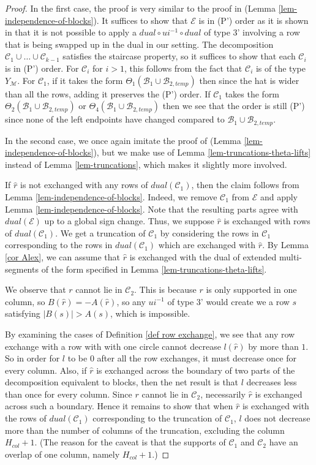 \documentclass[11pt,letterpaper]{amsart}
\newcommand{\inv}{^{-1}}
\newcommand{\BB}{\mathcal{B}}
\newcommand{\CC}{\mathcal{C}}
\newcommand{\EE}{\mathcal{E}}
\numberwithin{equation}{section}
\begin{document}
\begin{proof}
    In the first case, the proof is very similar to the proof in \cite[Lemma 7.12]{HKT26} (Lemma \ref{lem-independence-of-blocks}). It suffices to show that $\EE$ is in (P') order as it is shown in \cite[p. 52, 3rd paragraph]{HKT26} that it is not possible to apply a $dual\circ ui^{-1} \circ dual$ of type 3' involving a row that is being swapped up in the dual in our setting. The decomposition $\CC_1 \cup \dots \cup \CC_{k-1}$ satisfies the staircase property, so it suffices to show that each $\CC_i$ is in (P') order. For $\CC_i$ for $i>1$, this follows from the fact that $\CC_i$ is of the type $Y_\mathcal{M}$. For $\CC_1$, if it takes the form $\Theta_1(\BB_1 \cup \BB_{2, temp})$ then since the hat is wider than all the rows, adding it preserves the (P') order. If $\CC_1$ takes the form $\Theta_2(\BB_1 \cup \BB_{2, temp})$ or $\Theta_4(\BB_1 \cup \BB_{2, temp})$ then we see that the order is still (P') since none of the left endpoints have changed compared to $\BB_1 \cup \BB_{2, temp}$.


    In the second case, we once again imitate the proof of \cite[Lemma 7.12]{HKT26} (Lemma \ref{lem-independence-of-blocks}), but we make use of Lemma \ref{lem-truncations-theta-lifts} instead of Lemma \ref{lem-truncations}, which makes it slightly more involved. 

    If $\widehat{r}$ is not exchanged with any rows of $dual(\CC_1)$, then the claim follows from Lemma \ref{lem-independence-of-blocks}. Indeed, we remove $\mathcal{C}_1$ from $\EE$ and apply Lemma \ref{lem-independence-of-blocks}. Note that the resulting parts agree with $dual(\EE)$ up to a global sign change.
    Thus, we suppose $\widehat{r}$ is exchanged with rows of $dual(\CC_1)$. We get a truncation of $\CC_1$ by considering the rows in $\CC_1$ corresponding to the rows in $dual(\CC_1)$ which are exchanged with $\widehat{r}$. By Lemma \ref{cor Alex}, we can assume that $\widehat{r}$ is exchanged with the dual of extended multi-segments of the form specified in Lemma \ref{lem-truncations-theta-lifts}.

    We observe that $r$ cannot lie in $\CC_2$. This is because $r$ is only supported in one column, so $B(\widehat{r}) = - A(\widehat{r})$, so any $ui\inv$ of type 3' would create we a row $s$ satisfying $|B(s)| > A(s)$, which is impossible.

    By examining the cases of Definition \ref{def row exchange}, we see that any row exchange with a row with with one circle cannot decrease $l(\widehat{r})$ by more than $1$. So in order for $l$ to be $0$ after all the row exchanges, it must decrease once for every column. Also, if $\widehat{r}$ is exchanged across the boundary of two parts of the decomposition equivalent to blocks, then the net result is that $l$ decreases less than once for every column. Since $r$ cannot lie in $\CC_2$, necessarily $\widehat{r}$ is exchanged across such a boundary. Hence it remains to show that when $\widehat{r}$ is exchanged with the rows of $dual(\CC_1)$ corresponding to the truncation of $\CC_1$, $l$ does not decrease more than the number of columns of the truncation, excluding the column $H_{col}+1$. (The reason for the caveat is that the supports of $\CC_1$ and $\CC_2$ have an overlap of one column, namely $H_{col}+1$.)


\end{proof}
\end{document}
